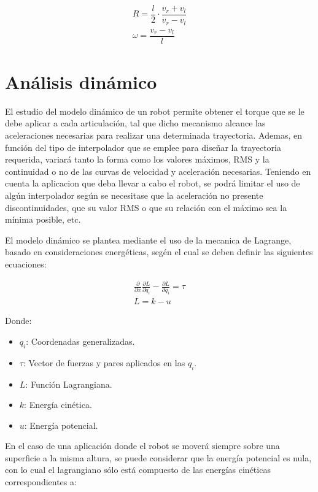 \documentclass[12pt,a4paper]{article}
\begin{document}
    \begin{align}
		R = \dfrac{l}{2} \cdot \dfrac{ v_r + v_l }{ v_r - v_l }\\[0.3cm]
        \omega = \dfrac{ v_r - v_l }{ l }
	\end{align}
    
    
    \section{Análisis dinámico}
    
    El estudio del modelo dinámico de un robot permite obtener el torque que se le debe aplicar a cada articulación, tal que dicho mecanismo alcance las aceleraciones necesarias para realizar una determinada trayectoria.
    Ademas, en función del tipo de interpolador que se emplee para diseñar la trayectoria requerida, variará tanto la forma como los valores máximos, RMS y la continuidad o no de las curvas de velocidad y aceleración necesarias.
    Teniendo en cuenta la aplicacion que deba llevar a cabo el robot, se podrá limitar el uso de algún interpolador según se necesitase que la aceleración no presente discontinuidades, que su valor RMS o que su relación con el máximo sea la mínima posible, etc.
    
	El modelo dinámico se plantea mediante el uso de la mecanica de Lagrange, basado en consideraciones energéticas, segén el cual se deben definir las siguientes ecuaciones:
    
    \begin{align}
		\frac{\partial}{\partial x}\frac{\partial L}{\partial \dot{q}_i}-\frac{\partial L}{\partial q_i}=\tau \\[0.2cm]
        L=k-u
	\end{align}
    
    Donde:

    \begin{itemize}
    	\item	$q_i$: Coordenadas generalizadas.
    	\item	$\tau$: Vector de fuerzas y pares aplicados en las $q_i$.
    	\item	$L$: Función Lagrangiana.
    	\item	$k$: Energía cinética.
	    \item	$u$: Energía potencial.
    \end{itemize}
    
    En el caso de una aplicación donde el robot se moverá siempre sobre una superficie a la misma altura, se puede considerar que la energía potencial es nula, con lo cual el lagrangiano sólo está compuesto de las energías cinéticas correspondientes a:
\end{document}
